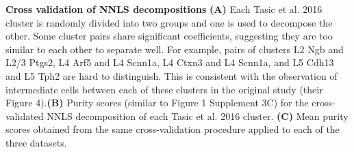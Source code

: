 \textbf{Cross validation of NNLS decompositions}
\textbf{(A)} Each Tasic et al. 2016 cluster is randomly divided into two groups and one is used to decompose the other. Some cluster pairs share significant coefficients, suggesting they are too similar to each other to separate well. For example, pairs of clusters L2 Ngb and L2/3 Ptgs2, L4 Arf5 and L4 Scnn1a, L4 Ctxn3 and L4 Scnn1a, and L5 Cdh13 and L5 Tph2 are hard to distinguish. This is consistent with the observation of intermediate cells between each of these clusters in the original study (their Figure 4).\textbf{(B)} Purity scores (similar to Figure 1 Supplement 3C) for the cross-validated NNLS decomposition of each Tasic et al. 2016 cluster. \textbf{(C)} Mean purity scores obtained from the same cross-validation procedure applied to each of the three datasets. 